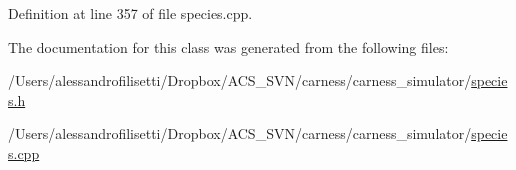 Definition at line 357 of file species.\-cpp.



The documentation for this class was generated from the following files\-:\begin{DoxyCompactItemize}
\item 
/\-Users/alessandrofilisetti/\-Dropbox/\-A\-C\-S\-\_\-\-S\-V\-N/carness/carness\-\_\-simulator/\hyperlink{species_8h}{species.\-h}\item 
/\-Users/alessandrofilisetti/\-Dropbox/\-A\-C\-S\-\_\-\-S\-V\-N/carness/carness\-\_\-simulator/\hyperlink{species_8cpp}{species.\-cpp}\end{DoxyCompactItemize}
